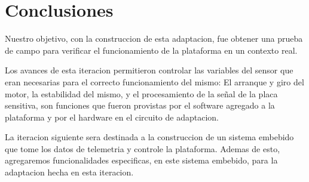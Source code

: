 

\section{Conclusiones} %
\label{it6:sec:conclusiones}

Nuestro objetivo, con la construccion de esta adaptacion, fue obtener una prueba de campo para verificar el funcionamiento de la plataforma en un contexto real.

Los avances de esta iteracion permitieron controlar las variables del sensor que eran necesarias para el correcto funcionamiento del mismo: El arranque y giro del motor, la estabilidad del mismo, y el procesamiento de la señal de la placa sensitiva, son funciones que fueron provistas por el software agregado a la plataforma y por el hardware en el circuito de adaptacion. 

La iteracion siguiente sera destinada a la construccion de un sistema embebido que tome los datos de telemetria y controle la plataforma. Ademas de esto, agregaremos funcionalidades especificas, en este sistema embebido, para la adaptacion hecha en esta iteracion. 


